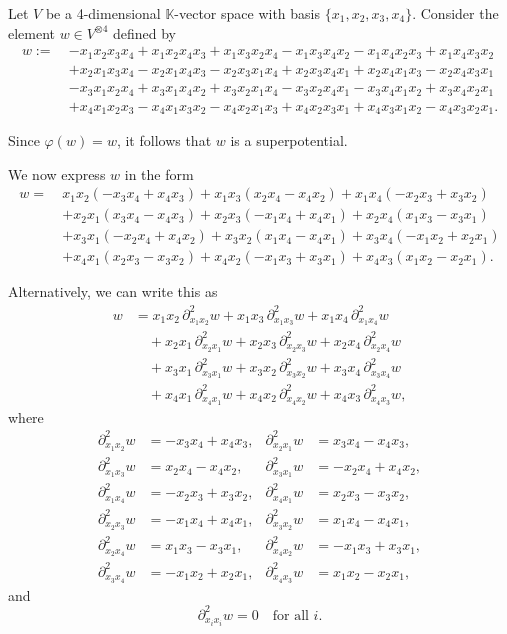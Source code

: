 \documentclass{amsart}
\begin{document}
\begin{example}\label{superpolyring}
Let \( V \) be a 4-dimensional \( \mathbb{K} \)-vector space with basis \( \{x_1, x_2, x_3, x_4\} \). Consider the element \( w \in V^{\otimes 4} \) defined by
\[
\begin{aligned}
w :=\ & -x_1x_2x_3x_4 + x_1x_2x_4x_3 + x_1x_3x_2x_4 - x_1x_3x_4x_2 - x_1x_4x_2x_3 + x_1x_4x_3x_2 \\
& + x_2x_1x_3x_4 - x_2x_1x_4x_3 - x_2x_3x_1x_4 + x_2x_3x_4x_1 + x_2x_4x_1x_3 - x_2x_4x_3x_1 \\
& - x_3x_1x_2x_4 + x_3x_1x_4x_2 + x_3x_2x_1x_4 - x_3x_2x_4x_1 - x_3x_4x_1x_2 + x_3x_4x_2x_1 \\
& + x_4x_1x_2x_3 - x_4x_1x_3x_2 - x_4x_2x_1x_3 + x_4x_2x_3x_1 + x_4x_3x_1x_2 - x_4x_3x_2x_1.
\end{aligned}
\]

Since \( \varphi(w) = w \), it follows that \( w \) is a superpotential.

We now express \( w \) in the form
\[
\begin{aligned}
w =\ & x_1x_2(-x_3x_4 + x_4x_3) + x_1x_3(x_2x_4 - x_4x_2) + x_1x_4(-x_2x_3 + x_3x_2) \\
& + x_2x_1(x_3x_4 - x_4x_3) + x_2x_3(-x_1x_4 + x_4x_1) + x_2x_4(x_1x_3 - x_3x_1) \\
& + x_3x_1(-x_2x_4 + x_4x_2) + x_3x_2(x_1x_4 - x_4x_1) + x_3x_4(-x_1x_2 + x_2x_1) \\
& + x_4x_1(x_2x_3 - x_3x_2) + x_4x_2(-x_1x_3 + x_3x_1) + x_4x_3(x_1x_2 - x_2x_1).
\end{aligned}
\]

Alternatively, we can write this as
\[
\begin{aligned}
w &= x_1x_2\, \partial^2_{x_1x_2} w + x_1x_3\, \partial^2_{x_1x_3} w + x_1x_4\, \partial^2_{x_1x_4} w \\
&\quad + x_2x_1\, \partial^2_{x_2x_1} w + x_2x_3\, \partial^2_{x_2x_3} w + x_2x_4\, \partial^2_{x_2x_4} w \\
&\quad + x_3x_1\, \partial^2_{x_3x_1} w + x_3x_2\, \partial^2_{x_3x_2} w + x_3x_4\, \partial^2_{x_3x_4} w \\
&\quad + x_4x_1\, \partial^2_{x_4x_1} w + x_4x_2\, \partial^2_{x_4x_2} w + x_4x_3\, \partial^2_{x_4x_3} w,
\end{aligned}
\]
where
\[
\begin{array}{rlrl}
\partial^2_{x_1x_2} w &= -x_3x_4 + x_4x_3, &
\partial^2_{x_2x_1} w &= x_3x_4 - x_4x_3, \\[3pt]
\partial^2_{x_1x_3} w &= x_2x_4 - x_4x_2, &
\partial^2_{x_3x_1} w &= -x_2x_4 + x_4x_2, \\[3pt]
\partial^2_{x_1x_4} w &= -x_2x_3 + x_3x_2, &
\partial^2_{x_4x_1} w &= x_2x_3 - x_3x_2, \\[3pt]
\partial^2_{x_2x_3} w &= -x_1x_4 + x_4x_1, &
\partial^2_{x_3x_2} w &= x_1x_4 - x_4x_1, \\[3pt]
\partial^2_{x_2x_4} w &= x_1x_3 - x_3x_1, &
\partial^2_{x_4x_2} w &= -x_1x_3 + x_3x_1, \\[3pt]
\partial^2_{x_3x_4} w &= -x_1x_2 + x_2x_1, &
\partial^2_{x_4x_3} w &= x_1x_2 - x_2x_1,
\end{array}
\]
and 
\[
\partial^2_{x_i x_i} w = 0 \quad \text{for all } i.
\]


\end{example}
\end{document}
